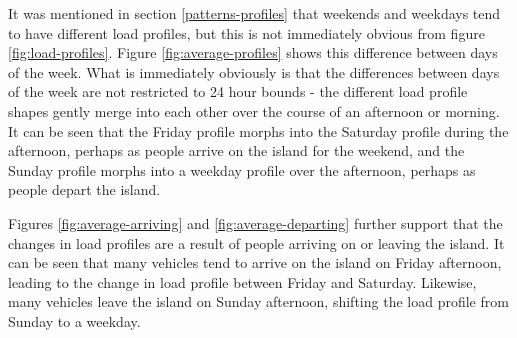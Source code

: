 It was mentioned in section \ref{patterns-profiles} that weekends and weekdays tend to have different load profiles, but this is not immediately obvious from figure \ref{fig:load-profiles}.
Figure \ref{fig:average-profiles} shows this difference between days of the week.
What is immediately obviously is that the differences between days of the week are not restricted to 24 hour bounds - the different load profile shapes gently merge into each other over the course of an afternoon or morning.
It can be seen that the Friday profile morphs into the Saturday profile during the afternoon, perhaps as people arrive on the island for the weekend, and the Sunday profile morphs into a weekday profile over the afternoon, perhaps as people depart the island.
\par
Figures \ref{fig:average-arriving} and \ref{fig:average-departing} further support that the changes in load profiles are a result of people arriving on or leaving the island.
It can be seen that many vehicles tend to arrive on the island on Friday afternoon, leading to the change in load profile between Friday and Saturday.
Likewise, many vehicles leave the island on Sunday afternoon, shifting the load profile from Sunday to a weekday.


